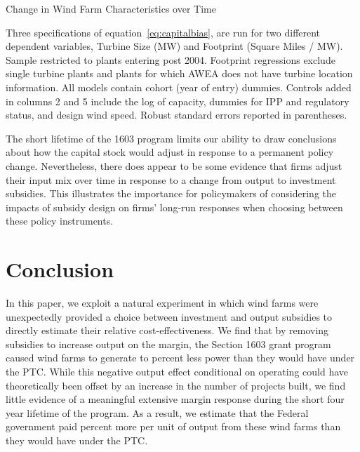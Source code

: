 \documentclass[12pt]{article}
\begin{document}
\begin{table}[H]
\begin{centering}
\caption{Change in Wind Farm Characteristics over Time\label{tab:input_mix_regs}}
\par\end{centering}
\begin{centering}
{\footnotesize{}}
\par\end{centering}{\footnotesize \par}
\footnotesize

Three specifications of equation~\ref{eq:capitalbias}, are run for two different dependent variables, Turbine Size (MW) and Footprint (Square Miles / MW). Sample restricted to plants entering post 2004. Footprint regressions exclude single turbine plants and plants for which AWEA does not have turbine location information. All models contain cohort (year of entry) dummies. Controls added in columns 2 and 5 include the log of capacity, dummies for IPP and regulatory status, and design wind speed. Robust standard errors reported in parentheses.
\end{table}

The short lifetime of the 1603 program limits our ability to draw conclusions about how the capital stock would adjust in response to a permanent policy change. Nevertheless, there does appear to be some evidence that firms adjust their input mix over time in response to a change from output to investment subsidies. This illustrates the importance for policymakers of considering the impacts of subsidy design on firms' long-run responses when choosing between these policy instruments.

\section{Conclusion \label{sec:Conclusion}}

In this paper, we exploit a natural experiment in which wind farms were unexpectedly provided a choice between investment and output subsidies to directly estimate their relative cost-effectiveness. We find that by removing subsidies to increase output on the margin, the Section 1603 grant program caused wind farms to generate to percent less power than they would have under the PTC. While this negative output effect conditional on operating could have theoretically been offset by an increase in the number of projects built, we find little evidence of a meaningful extensive margin response during the short four year lifetime of the program. As a result, we estimate that the Federal government paid percent more per unit of output from these wind farms than they would have under the PTC. 
\end{document}

